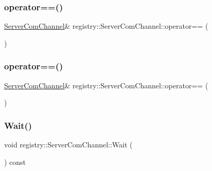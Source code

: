 \subsubsection{\texorpdfstring{operator==()}{operator==()}\hspace{0.1cm}{\footnotesize\ttfamily [1/2]}}
{\footnotesize\ttfamily \hyperlink{classregistry_1_1ServerComChannel}{Server\+Com\+Channel}\& registry\+::\+Server\+Com\+Channel\+::operator== (\begin{DoxyParamCaption}\item[{\hyperlink{classregistry_1_1ServerComChannel}{Server\+Com\+Channel} const \&}]{ }\end{DoxyParamCaption})\hspace{0.3cm}{\ttfamily [delete]}}

\mbox{\label{classregistry_1_1ServerComChannel_ab83cb6ed5be5016e624d5eb7cc3cacfa}} 
\subsubsection{\texorpdfstring{operator==()}{operator==()}\hspace{0.1cm}{\footnotesize\ttfamily [2/2]}}
{\footnotesize\ttfamily \hyperlink{classregistry_1_1ServerComChannel}{Server\+Com\+Channel}\& registry\+::\+Server\+Com\+Channel\+::operator== (\begin{DoxyParamCaption}\item[{\hyperlink{classregistry_1_1ServerComChannel}{Server\+Com\+Channel} const \&\&}]{ }\end{DoxyParamCaption})\hspace{0.3cm}{\ttfamily [delete]}}

\mbox{\label{classregistry_1_1ServerComChannel_a0e6f4848bca2c88047bb6ce75d28f335}} 
\subsubsection{\texorpdfstring{Wait()}{Wait()}}
{\footnotesize\ttfamily void registry\+::\+Server\+Com\+Channel\+::\+Wait (\begin{DoxyParamCaption}{ }\end{DoxyParamCaption}) const\hspace{0.3cm}{\ttfamily [inline]}}



